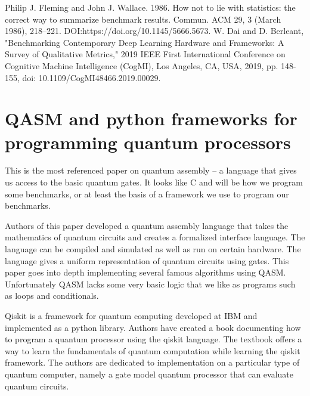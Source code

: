 \documentclass{article}
\begin{document}
\begin{thebibliography}{00}
    \makeatletter
    \addtocounter{\@listctr}{2}
    \makeatother
     Philip J. Fleming and John J. Wallace. 1986. How not to lie with statistics: the correct way to summarize benchmark results. Commun. ACM 29, 3 (March 1986), 218–221. DOI:https://doi.org/10.1145/5666.5673.
     W. Dai and D. Berleant, "Benchmarking Contemporary Deep Learning Hardware and Frameworks: A Survey of Qualitative Metrics," 2019 IEEE First International Conference on Cognitive Machine Intelligence (CogMI), Los Angeles, CA, USA, 2019, pp. 148-155, doi: 10.1109/CogMI48466.2019.00029.
\end{thebibliography}

\section{QASM and python frameworks for programming quantum processors}

This is the most referenced paper on quantum assembly -- a language that gives us access to the basic quantum gates. It looks like C and will be how we program some benchmarks, or at least the basis of a framework we use to program our benchmarks.

Authors of this paper developed a quantum assembly language that takes the mathematics of quantum circuits and creates a formalized interface language. The language can be compiled and simulated as well as run on certain hardware. The language gives a uniform representation of quantum circuits using gates. This paper goes into depth implementing several famous algorithms using QASM. Unfortunately QASM lacks some very basic logic that we like as programs such as loops and conditionals. 

Qiskit \cite{b10} is a framework for quantum computing developed at IBM and implemented as a python library. Authors have created a book documenting how to program a quantum processor using the qiskit language. The textbook offers a way to learn the fundamentals of quantum computation while learning the qiskit framework. The authors are dedicated to implementation on a particular type of quantum computer, namely a gate model quantum processor that can evaluate quantum circuits. 
\end{document}
